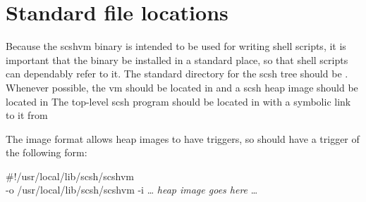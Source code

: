 \section{Standard file locations}
Because the scshvm binary is intended to be used for writing shell
scripts, it is important that the binary be installed in a standard
place, so that shell scripts can dependably refer to it.
The standard directory for the scsh tree should be .
Whenever possible, the vm should be located in
and a scsh heap image should be located in
The top-level scsh program should be located in
with a symbolic link to it from

The {\scm} image format allows heap images to have \ex{\#!} triggers,
so  should have a \ex{\#!} trigger of the following form:
\begin{code}
#!/usr/local/lib/scsh/scshvm \\
-o /usr/local/lib/scsh/scshvm -i
{\ldots} \textnormal{\emph{heap image goes here}} \ldots\end{code}

